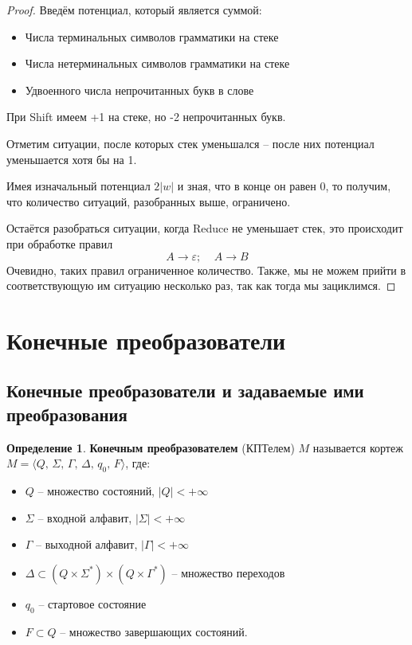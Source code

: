 \documentclass[a4paper,12pt]{article}
\theoremstyle{plain}
\theoremstyle{definition}
\newtheorem{definition}{Определение}[subsection]
\theoremstyle{remark}
\begin{document}
\begin{proof}
	Введём потенциал, который является суммой:
	\begin{itemize}
		\item Числа терминальных символов грамматики на стеке
		\item Числа нетерминальных символов грамматики на стеке
		\item Удвоенного числа непрочитанных букв в слове
	\end{itemize}
	При Shift имеем +1 на стеке, но -2 непрочитанных букв.

	Отметим ситуации, после которых стек уменьшался -- после них потенциал уменьшается хотя бы на 1.

	Имея изначальный потенциал $2\vert w\vert$ и зная, что в конце он равен $0$, то получим, что количество ситуаций, разобранных выше, ограничено.

	Остаётся разобраться ситуации, когда Reduce не уменьшает стек, это происходит при обработке правил
	\[
		A \to \varepsilon ;\;\;\;\; A \to B
	\]
	Очевидно, таких правил ограниченное количество. Также, мы не можем прийти в соответствующую им ситуацию несколько раз, так как тогда мы зациклимся.
\end{proof}

\section{Конечные преобразователи}
\subsection{Конечные преобразователи и задаваемые ими преобразования}
\begin{definition}
	\textbf{Конечным преобразователем} (КПТелем) $M$ называется кортеж $M = \langle Q,\,\Sigma,\,\Gamma,\,\Delta,\, q_0,\, F\rangle$, где:
	\begin{itemize}
		\item $Q$ -- множество состояний, $\vert Q\vert < +\infty$
		\item $\Sigma$ -- входной алфавит, $\vert \Sigma\vert < +\infty$
		\item $\Gamma$ -- выходной алфавит, $\vert \Gamma\vert < +\infty$
		\item $\Delta \subset (Q \times \Sigma^*) \times (Q \times \Gamma^*)$ -- множество переходов
		\item $q_0$ -- стартовое состояние
		\item $F \subset Q$ -- множество завершающих состояний.
	\end{itemize}
\end{definition}
\end{document}
